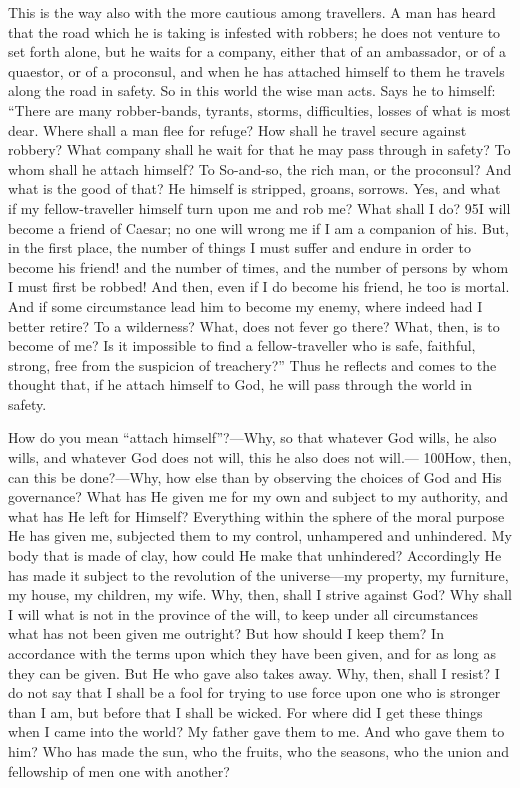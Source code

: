 This is the way also with the more cautious among travellers. A man has heard that the road which he is taking is infested with robbers; he does not venture to set forth alone, but he waits for a company, either that of an ambassador, or of a quaestor, or of a proconsul, and when he has attached himself to them he travels along the road in safety. So in this world the wise man acts. Says he to himself: ``There are many robber-bands, tyrants, storms, difficulties, losses of what is most dear. Where shall a man flee for refuge? How shall he travel secure against robbery? What company shall he wait for that he may pass through in safety? To whom shall he attach himself? To So-and-so, the rich man, or the proconsul? And what is the good of that? He himself is stripped, groans, sorrows. Yes, and what if my fellow-traveller himself turn upon me and rob me? What shall I do? 95I will become a friend of Caesar; no one will wrong me if I am a companion of his. But, in the first place, the number of things I must suffer and endure in order to become his friend! and the number of times, and the number of persons by whom I must first be robbed! And then, even if I do become his friend, he too is mortal. And if some circumstance lead him to become my enemy, where indeed had I better retire? To a wilderness? What, does not fever go there? What, then, is to become of me? Is it impossible to find a fellow-traveller who is safe, faithful, strong, free from the suspicion of treachery?'' Thus he reflects and comes to the thought that, if he attach himself to God, he will pass through the world in safety.

How do you mean ``attach himself''?—Why, so that whatever God wills, he also wills, and whatever God does not will, this he also does not will.— 100How, then, can this be done?—Why, how else than by observing the choices of God and His governance? What has He given me for my own and subject to my authority, and what has He left for Himself? Everything within the sphere of the moral purpose He has given me, subjected them to my control, unhampered and unhindered. My body that is made of clay, how could He make that unhindered? Accordingly He has made it subject to the revolution of the universe—my property, my furniture, my house, my children, my wife. Why, then, shall I strive against God? Why shall I will what is not in the province of the will, to keep under all circumstances what has not been given me outright? But how should I keep them? In accordance with the terms upon which they have been given, and for as long as they can be given. But He who gave also takes away. Why, then, shall I resist? I do not say that I shall be a fool for trying to use force upon one who is stronger than I am, but before that I shall be wicked. For where did I get these things when I came into the world? My father gave them to me. And who gave them to him? Who has made the sun, who the fruits, who the seasons, who the union and fellowship of men one with another?

